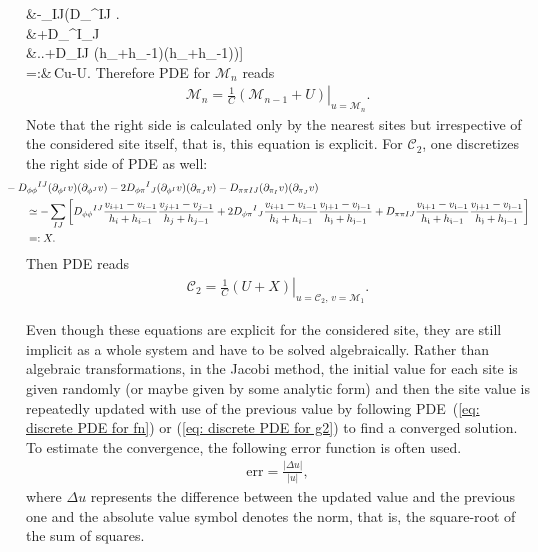 \documentclass[aps, prd
, preprint
, nofootinbib 
, longbibliography
]{revtex4-1}
\newcommand{\calC}{\mathcal{C}}
\newcommand{\calM}{\mathcal{M}}
\newcommand{\bae}[1]{\begin{align} #1 \end{align}}
\begin{document}
{	&\hspace{20pt}-\sum_{I\neq J}\left(D_{\phi\phi}{}^{IJ} \right. \nonumber \\
	&\hspace{40pt}+D_{\phi\pi}{}^I{}_J
	\nonumber \\
	&\hspace{40pt}\left.\left.+D_{\pi\pi IJ}
	{(h_+h_{-1})(h_+h_{-1})}\right)\right] \nonumber \\
	=:&\,Cu-U.
}
Therefore PDE for $\calM_n$ reads
\bae{\label{eq: discrete PDE for fn}
	\calM_n=\left.\frac{1}{C}(\calM_{n-1}+U)\right|_{u=\calM_n}.
}
Note that the right side is calculated only by the nearest sites but irrespective of the considered site itself, that is, this equation is explicit.
For $\calC_2$, one discretizes the right side of PDE as well:
\bae{
	&\hspace{-20pt}-D_{\phi\phi}{}^{IJ}(\partial_{\phi^I}v)(\partial_{\phi^J}v)-2D_{\phi\pi}{}^I{}_J(\partial_{\phi^I}v)(\partial_{\pi_J}v)-D_{\pi\pi IJ}(\partial_{\pi_I}v)(\partial_{\pi_J}v) \nonumber \\
	&\simeq-\sum_{IJ}\left[D_{\phi\phi}{}^{IJ}\frac{v_{i+1}-v_{i-1}}{h_i+h_{i-1}}\frac{v_{j+1}-v_{j-1}}{h_j+h_{j-1}} 
	+2D_{\phi\pi}{}^I{}_J\frac{v_{i+1}-v_{i-1}}{h_i+h_{i-1}}\frac{v_{\mathfrak{j}+1}-v_{\mathfrak{j}-1}}{h_\mathfrak{j}+h_{\mathfrak{j}-1}}
	+D_{\pi\pi IJ}\frac{v_{\mathfrak{i}+1}-v_{\mathfrak{i}-1}}{h_\mathfrak{i}+h_{\mathfrak{i}-1}}\frac{v_{\mathfrak{j}+1}-v_{\mathfrak{j}-1}}{h_\mathfrak{j}+h_{\mathfrak{j}-1}}\right] \nonumber \\
	&=:X.
}
Then PDE reads
\bae{\label{eq: discrete PDE for g2}
	\calC_2=\left.\frac{1}{C}(U+X)\right|_{u=\calC_2,\,v=\calM_1}.
}

Even though these equations are explicit for the considered site, they are still implicit as a whole system and have to be solved algebraically. 
Rather than algebraic transformations, in the Jacobi method, the initial value for each site is given randomly (or maybe given by some analytic form) and then the site value
is repeatedly updated with use of the previous value by following PDE~(\ref{eq: discrete PDE for fn}) or (\ref{eq: discrete PDE for g2}) to find a converged solution.
To estimate the convergence, the following error function is often used.
\bae{
	\text{err}=\frac{|\Delta u|}{|u|},
}
where $\Delta u$ represents the difference between the updated value and the previous one and the absolute value symbol denotes the norm, that is, the square-root of the sum of squares.
\end{document}
